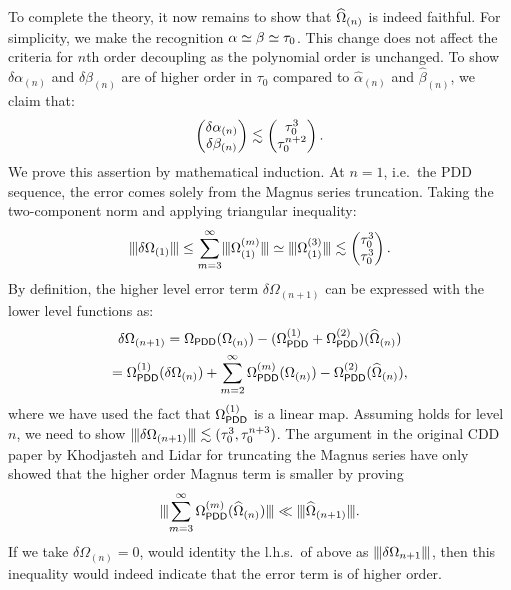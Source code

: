 \documentclass[pra,reprint,superscriptaddress]{revtex4-2}
\newcommand{\Opdd}{\Omega_{\mathsf{PDD}}}
\begin{document}
{To complete the theory, it now remains to show that $\widehat{\Omega}_{(n)}$ is indeed faithful. For simplicity, we make the recognition $\alpha\simeq\beta\simeq\tau_0$.
This change does not affect the criteria for $n$th order decoupling as the polynomial order is unchanged. To show $\delta\alpha_{(n)}$ and $\delta\beta_{(n)}$ are of higher order in $\tau_0$ compared to $\widehat\alpha_{(n)}$ and $\widehat\beta_{(n)}$, we claim that:
\begin{equation}\label{eq:cdd-error-bounds}
\begin{pmatrix}
\delta\alpha_{(n)}\\
\delta\beta_{(n)} 
\end{pmatrix}
\lesssim
\begin{pmatrix}
\tau_0^3\\
\tau_0^{n+2} 
\end{pmatrix}.
\end{equation}
We prove this assertion by mathematical induction.
At $n=1$,  i.e.\ the PDD sequence, the error comes solely from the Magnus series truncation.
Taking the two-component norm and applying triangular inequality:
\begin{equation}
\opnorm{\delta\Omega_{(1)}}\le\sum_{m=3}^\infty \opnorm{\Omega_{(1)}\up{m}}
\simeq \opnorm{\Omega_{(1)}\up{3}} \lesssim
\begin{pmatrix}
\Dt^3\\
\Dt^3
\end{pmatrix}.
\end{equation}
By definition, the higher level error term $\delta\Omega_{(n+1)}$ can be 
expressed with the lower level functions as:
\begin{multline}\label{eq:error update}
\delta\Omega_{(n+1)} 
=\Opdd(\Omega_{(n)})-(\Opdd\up{1}+\Opdd\up{2})(\Ohat_{(n)})\\
= \Opdd\up{1}(\delta\Omega_{(n)})+ \sum_{m=2}^\infty \Opdd\up{m}(\Omega_{(n)})-\Opdd\up{2}(\Ohat_{(n)}),
\end{multline} 
where we have used the fact that $\Opdd\up{1}$ is a linear map. Assuming   holds for level $n$, we need to show $\opnorm{\delta\Omega_{(n+1)}}\lesssim(\Dt^3,\Dt^{n+3})$.
The argument in the original CDD paper by Khodjasteh and Lidar for truncating the Magnus series have only showed that the higher order Magnus term is smaller by proving
\begin{equation*}
    \opnorm{ \sum_{m=3}^\infty\Opdd\up{m}(\Ohat_{(n)}) } \ll \opnorm{\Ohat_{(n+1)}}.
\end{equation*}
If we take $\delta\Omega_{(n)}=0$,  would identity the l.h.s.\  of above as $\opnorm{\delta \Omega_{n+1}}$, then this inequality would indeed indicate that the error term is of higher order.
}
\end{document}
